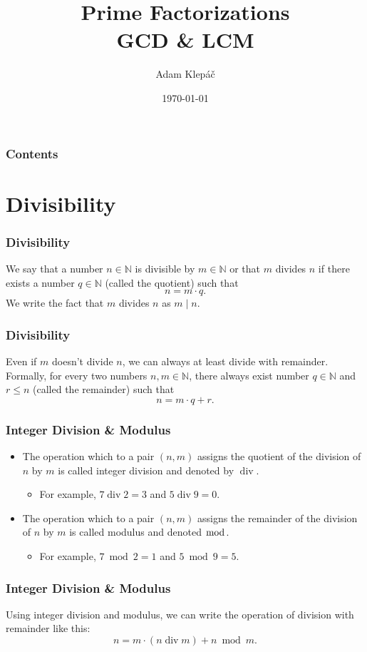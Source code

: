 \documentclass[aspectratio=169,11pt,usenames,dvipsnames,handout]{beamer}
\title{Prime Factorizations\\
GCD \& LCM}
\date{\today}
\author{Adam Klepáč}
\institute[GEVO]{Gymnázium Evolution Jižní Město}
\newcommand{\N}{\mathbb{N}}
\DeclareMathOperator{\dv}{div}
\begin{document}
\titleframe

\begin{frame}
 \frametitle{Contents}
 \tableofcontents
\end{frame}

\section{Divisibility}

\begin{frame}
 \frametitle{Divisibility}
  We say that a number $n \in \N$ \alert{is divisible} by $m \in \N$ or that $m$
  \alert{divides} $n$ \pause
  if there exists a number $q \in \N$ (called the \alert{quotient}) such that
  \[
   n = m \cdot q.
  \]
  \pause
  We write the fact that $m$ divides $n$ as $m \mid n$.
\end{frame}

\begin{frame}
 \frametitle{Divisibility}
 Even if $m$ doesn't divide $n$, we can always at least \alert{divide with
 remainder}.\\
 \pause
 Formally, for every two numbers $n,m \in \N$, there always exist number $q \in
 \N$ and $r \leq n$ (called the \alert{remainder}) such that
 \[
  n = m \cdot q + r.
 \]
\end{frame}

\begin{frame}
 \frametitle{Integer Division \& Modulus}
 \begin{itemize}
  \item The operation which to a pair $(n,m)$ assigns the \alert{quotient} of
   the division of $n$ by $m$ is called \alert{integer division} and denoted by
   $\dv$.
  \pause
  \begin{itemize}
   \item For example, $7 \dv 2 = 3$ and $5 \dv 9 = 0$.
  \end{itemize}
  \pause
 \item The operation which to a pair $(n,m)$ assigns the \alert{remainder} of
  the division of $n$ by $m$ is called \alert{modulus} and denoted $\bmod$.
  \pause
  \begin{itemize}
   \item For example, $7 \bmod 2 = 1$ and $5 \bmod 9 = 5$.
  \end{itemize}
 \end{itemize}
\end{frame}

\begin{frame}
 \frametitle{Integer Division \& Modulus}
 Using integer division and modulus, we can write the operation of division with
 remainder like this:
 \[
  n = m \cdot (n \dv m) + n \bmod m.
 \]
\end{frame}
\end{document}
